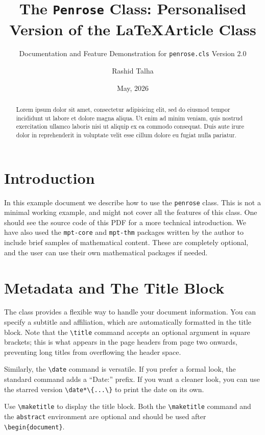 \documentclass[11pt]{penrose}
\title[\texttt{Penrose} Class Demo]{The \texttt{Penrose} Class: Personalised Version of the \LaTeX Article Class}
\subtitle{Documentation and Feature Demonstration for \texttt{penrose.cls} Version 2.0}
\author{Rashid Talha}
\affiliation{Scuola Internazionale Superiore di Studi Avanzati (SISSA), Trieste, Italy}
\date*{May, 2026}
\begin{document}
\maketitle

\begin{abstract}
  Lorem ipsum dolor sit amet, consectetur adipisicing elit, sed do eiusmod tempor incididunt ut labore et dolore magna aliqua. Ut enim ad minim veniam, quis nostrud exercitation ullamco laboris nisi ut aliquip ex ea commodo consequat. Duis aute irure dolor in reprehenderit in voluptate velit esse cillum dolore eu fugiat nulla pariatur.
\end{abstract}


\section{Introduction}
In this example document we describe how to use the \texttt{penrose} class. This is not a minimal working example, and might not cover all the features of this class. One should see the source code of this PDF for a more technical introduction. We have also used the \texttt{mpt-core} and \texttt{mpt-thm} packages written by the author to include brief samples of mathematical content. These are completely optional, and the user can use their own mathematical packages if needed.

\section{Metadata and The Title Block}
The class provides a flexible way to handle your document information. You can specify a subtitle and affiliation, which are automatically formatted in the title block. Note that the \verb|\title| command accepts an optional argument in square brackets; this is what appears in the page headers from page two onwards, preventing long titles from overflowing the header space.

Similarly, the \verb|\date| command is versatile. If you prefer a formal look, the standard command adds a ``Date:'' prefix. If you want a cleaner look, you can use the starred version \verb|\date*\{...\}| to print the date on its own.

Use \verb|\maketitle| to display the title block. Both the \verb|\maketitle| command and the \verb|abstract| environment are optional and should be used after \verb|\begin{document}|.
\end{document}

